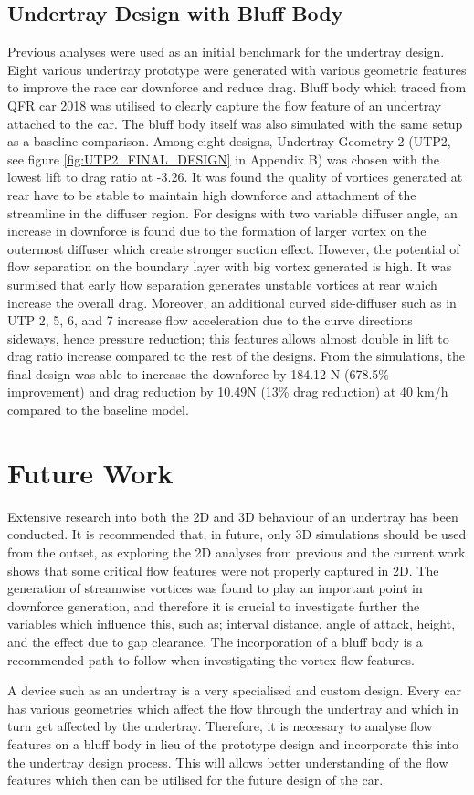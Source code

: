 \subsection{Undertray Design with Bluff Body}
Previous analyses were used as an initial benchmark for the undertray design. Eight various undertray prototype were generated with various geometric features to improve the race car downforce and reduce drag. Bluff body which traced from QFR car 2018 was utilised to clearly capture the flow feature of an undertray attached to the car. The bluff body itself was also simulated with the same setup as a baseline comparison. Among eight designs, Undertray Geometry 2 (UTP2, see figure \ref{fig:UTP2_FINAL_DESIGN} in Appendix B) was chosen with the lowest lift to drag ratio at -3.26. It was found the quality of vortices generated at rear have to be stable to maintain high downforce and attachment of the streamline in the diffuser region. For designs with two variable diffuser angle, an increase in downforce is found due to the formation of larger vortex on the outermost diffuser which create stronger suction effect. However, the potential of flow separation on the boundary layer with big vortex generated is high. It was surmised that early flow separation generates unstable vortices at rear which increase the overall drag. Moreover, an additional curved side-diffuser such as in UTP 2, 5, 6, and 7 increase flow acceleration due to the curve directions sideways, hence pressure reduction; this features allows almost double in lift to drag ratio increase compared to the rest of the designs. From the simulations, the final design was able to increase the downforce by 184.12 N (678.5\% improvement) and drag reduction by 10.49N (13\% drag reduction) at 40 km/h compared to the baseline model.


\section{Future Work}
\noindent Extensive research into both the 2D and 3D behaviour of an undertray has been conducted. It is recommended that, in future, only 3D simulations should be used from the outset, as exploring the 2D analyses from previous and the current work shows that some critical flow features were not properly captured in 2D. The generation of streamwise vortices was found to play an important point in downforce generation, and therefore it is crucial to investigate further the variables which influence this, such as; interval distance, angle of attack, height, and the effect due to gap clearance. The incorporation of a bluff body is a recommended path to follow when investigating the vortex flow features.

\noindent A device such as an undertray is a very specialised and custom design. Every car has various geometries which affect the flow through the undertray and which in turn get affected by the undertray. Therefore, it is necessary to analyse flow features on a bluff body in lieu of the prototype design and incorporate this into the undertray design process. This will allows better understanding of the flow features which then can be utilised for the future design of the car.

